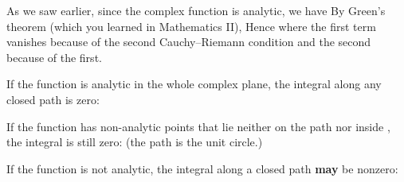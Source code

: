 \begin{EMjoin}

\begin{EMunit}


\end{EMunit}

\begin{EMproof}{}

As we saw earlier, since the complex function is analytic, we have
By Green's theorem (which you learned in Mathematics II),
Hence
where the first term vanishes because of the second Cauchy--Riemann condition and the second because of the first.

\end{EMproof}

\end{EMjoin}

\begin{EMexample}{}

If the function is analytic in the whole complex plane, the integral along any closed path is zero:

\end{EMexample}

\begin{EMexample}{}

If the function has non-analytic points that lie neither on the path nor inside , the integral is still zero:
(the path is the unit circle.)

\end{EMexample}

\begin{EMexample}{}

If the function is not analytic, the integral along a closed path \textbf{may} be nonzero:

\end{EMexample}


